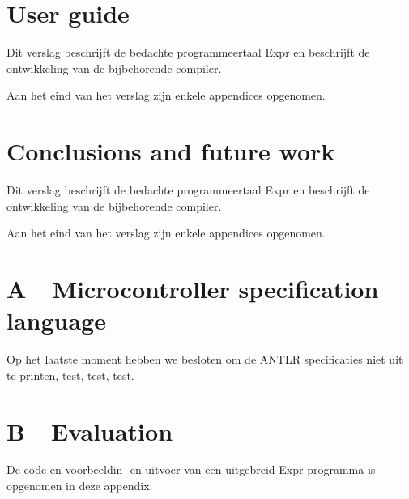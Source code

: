 \documentclass[a4paper]{report}
\begin{document}
\clearpage\chapter{User guide}
Dit verslag beschrijft de bedachte programmeertaal Expr en beschrijft de
ontwikkeling van de bijbehorende compiler.

Aan het eind van het verslag zijn enkele appendices opgenomen. 

\clearpage\chapter{Conclusions and future work}
Dit verslag beschrijft de bedachte programmeertaal Expr en beschrijft de
ontwikkeling van de bijbehorende compiler.

Aan het eind van het verslag zijn enkele appendices opgenomen. 

\clearpage\chapter[A\ \ Microcontroller specification
language]{A\ \ Microcontroller specification language}
Op het laatste moment hebben we besloten om de ANTLR specificaties niet
uit te printen, test, test, test.

\clearpage\chapter[B\ \ Evaluation]{B\ \ Evaluation}
De code en voorbeeldin- en uitvoer van een uitgebreid Expr programma is
opgenomen in deze appendix.
\end{document}
